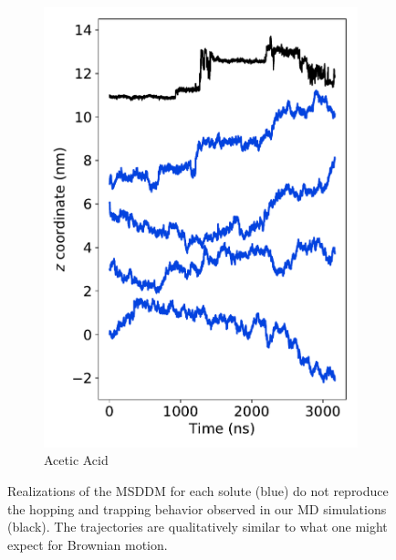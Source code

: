 \documentclass[aps,pre,preprint,groupedaddress]{revtex4-2}
\begin{document}
\begin{figure}
\begin{subfigure}{0.24\textwidth}
  \includegraphics[width=\textwidth]{stacked_msddm_realizations_ACH.pdf}
  \caption{Acetic Acid}\label{fig:stacked_msddm_realizations_ACH}
  \end{subfigure}
  \caption{Realizations of the MSDDM for each solute (blue) do not reproduce 
  the hopping and trapping behavior observed in our MD simulations (black). 
  The trajectories are qualitatively similar to what one might expect for 
  Brownian motion. 
  }\label{fig:msddm_eyetest}
  \end{figure}
  
\end{document}
